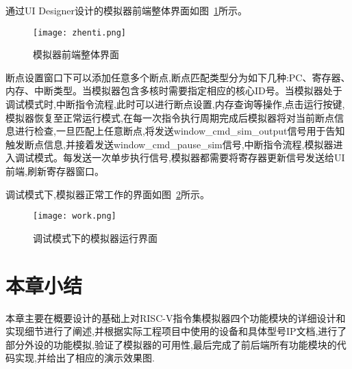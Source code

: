 通过UI Designer设计的模拟器前端整体界面如图~\ref{fig:zhenti}所示。
\begin{figure}[h]
    \centering
    \texttt{[image: zhenti.png]}
    \caption{模拟器前端整体界面}
    \label{fig:zhenti}
\end{figure}


断点设置窗口下可以添加任意多个断点,断点匹配类型分为如下几种:PC、寄存器、内存、中断类型。当模拟器包含多核时需要指定相应的核心ID号。当模拟器处于调试模式时,中断指令流程,此时可以进行断点设置,内存查询等操作,点击运行按键,模拟器恢复至正常运行模式,在每一次指令执行周期完成后模拟器将对当前断点信息进行检查,一旦匹配上任意断点,将发送window\_cmd\_sim\_output信号用于告知触发断点信息,并接着发送window\_cmd\_pause\_sim信号,中断指令流程,模拟器进入调试模式。每发送一次单步执行信号,模拟器都需要将寄存器更新信号发送给UI前端,刷新寄存器窗口。




        
        
        


调试模式下,模拟器正常工作的界面如图~\ref{fig:work}所示。
\begin{figure}[H]
    \centering
    \texttt{[image: work.png]}
    \caption{调试模式下的模拟器运行界面}
    \label{fig:work}
\end{figure}


\section{本章小结}
本章主要在概要设计的基础上对RISC-V指令集模拟器四个功能模块的详细设计和实现细节进行了阐述,并根据实际工程项目中使用的设备和具体型号IP文档,进行了部分外设的功能模拟,验证了模拟器的可用性,最后完成了前后端所有功能模块的代码实现,并给出了相应的演示效果图.



